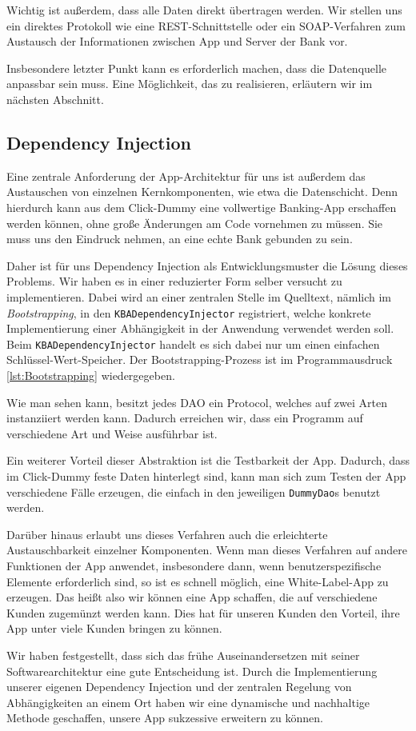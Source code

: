 	Wichtig ist außerdem, dass alle Daten direkt übertragen werden. Wir stellen uns ein direktes Protokoll wie eine \acs{REST}-Schnittstelle oder ein \acs{SOAP}-Verfahren zum Austausch der Informationen zwischen App und Server der Bank vor.
	
	Insbesondere letzter Punkt kann es erforderlich machen, dass die Datenquelle anpassbar sein muss. Eine Möglichkeit, das zu realisieren, erläutern wir im nächsten Abschnitt.

\subsection{Dependency Injection}
	Eine zentrale Anforderung der App-Architektur für uns ist außerdem das Austauschen von einzelnen Kernkomponenten, wie etwa die Datenschicht. Denn hierdurch kann aus dem Click-Dummy eine vollwertige Banking-App erschaffen werden können, ohne große Änderungen am Code vornehmen zu müssen. Sie muss uns den Eindruck nehmen, an eine echte Bank gebunden zu sein.
	
	Daher ist für uns Dependency Injection als Entwicklungsmuster die Lösung dieses Problems. Wir haben es in einer reduzierter Form selber versucht zu implementieren. Dabei wird an einer zentralen Stelle im Quelltext, nämlich im \emph{Bootstrapping}, in den \texttt{KBADependencyInjector} registriert, welche konkrete Implementierung einer Abhängigkeit in der Anwendung verwendet werden soll. Beim \texttt{KBADependencyInjector} handelt es sich dabei nur um einen einfachen Schlüssel-Wert-Speicher. Der Bootstrapping-Prozess ist im Programmausdruck \ref{lst:Bootstrapping} wiedergegeben.
	
	
	
	Wie man sehen kann, besitzt jedes \ac{DAO} ein Protocol, welches auf zwei Arten instanziiert werden kann. Dadurch erreichen wir, dass ein Programm auf verschiedene Art und Weise ausführbar ist.
	
	Ein weiterer Vorteil dieser Abstraktion ist die Testbarkeit der App. Dadurch, dass im Click-Dummy feste Daten hinterlegt sind, kann man sich zum Testen der App verschiedene Fälle erzeugen, die einfach in den jeweiligen \texttt{DummyDao}s benutzt werden.
	
	Darüber hinaus erlaubt uns dieses Verfahren auch die erleichterte Austauschbarkeit einzelner Komponenten. Wenn man dieses Verfahren auf andere Funktionen der App anwendet, insbesondere dann, wenn benutzerspezifische Elemente erforderlich sind, so ist es schnell möglich, eine White-Label-App zu erzeugen. Das heißt also wir können eine App schaffen, die auf verschiedene Kunden zugemünzt werden kann. Dies hat für unseren Kunden den Vorteil, ihre App unter viele Kunden bringen zu können.
	
	Wir haben festgestellt, dass sich das frühe Auseinandersetzen mit seiner Softwarearchitektur eine gute Entscheidung ist. Durch die Implementierung unserer eigenen Dependency Injection und der zentralen Regelung von Abhängigkeiten an einem Ort haben wir eine dynamische und nachhaltige Methode geschaffen, unsere App sukzessive erweitern zu können.